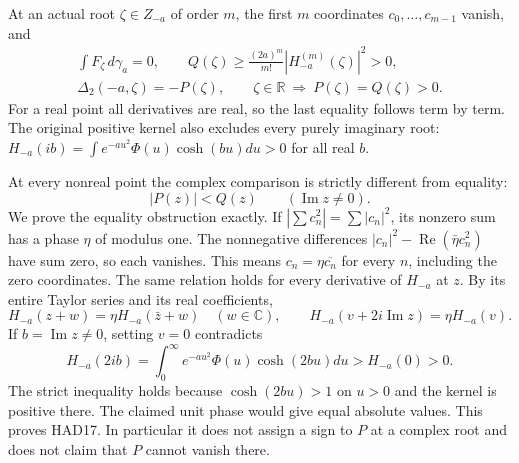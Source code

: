 At an actual root $\zeta\in Z_{-a}$ of order $m$, the
first $m$ coordinates $c_0,\ldots,c_{m-1}$ vanish, and
\begin{equation}\tag{HAD16}
\begin{gathered}
 \int F_\zeta\,d\gamma_a=0,\qquad
 Q(\zeta)\ge\frac{(2a)^m}{m!}
                         |H_{-a}^{(m)}(\zeta)|^2>0,\\
 \Delta_2(-a,\zeta)=-P(\zeta),\qquad
 \zeta\in\mathbb R\ \Longrightarrow\ P(\zeta)=Q(\zeta)>0.
\end{gathered}
\end{equation}
For a real point all derivatives are real, so the last
equality follows term by term. The original positive
kernel also excludes every purely imaginary root:
$H_{-a}(ib)=\int e^{-au^2}\Phi(u)\cosh(bu)du>0$
for all real $b$.

At every nonreal point the complex comparison is strictly
different from equality:
\begin{equation}\tag{HAD17}
             |P(z)|<Q(z)\qquad(\operatorname{Im}z\ne0).
\end{equation}
We prove the equality obstruction exactly. If
$|\sum c_n^2|=\sum|c_n|^2$, its nonzero sum has a phase
$\eta$ of modulus one. The nonnegative differences
$|c_n|^2-\operatorname{Re}(\bar\eta c_n^2)$ have sum
zero, so each vanishes. This means
$c_n=\eta\overline{c_n}$ for every $n$, including the
zero coordinates. The same relation holds for every
derivative of $H_{-a}$ at $z$. By its entire Taylor
series and its real coefficients,
\[
 H_{-a}(z+w)=\eta H_{-a}(\bar z+w)
 \quad(w\in\mathbb C),\qquad
 H_{-a}(v+2i\operatorname{Im}z)=\eta H_{-a}(v).
\]
If $b=\operatorname{Im}z\ne0$, setting $v=0$ contradicts
\[
 H_{-a}(2ib)=\int_0^\infty e^{-au^2}\Phi(u)\cosh(2bu)du
                         > H_{-a}(0)>0.
\]
The strict inequality holds because $\cosh(2bu)>1$ on
$u>0$ and the kernel is positive there. The claimed
unit phase would give equal absolute values. This proves
HAD17. In particular it does not assign a sign to $P$
at a complex root and does not claim that $P$ cannot
vanish there.

